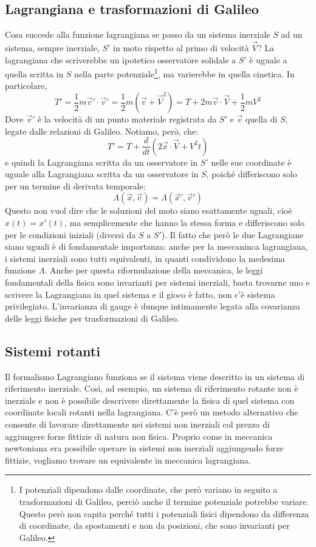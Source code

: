 \documentclass[a4paper,openany]{article}
\begin{document}
	\subsection{Lagrangiana e trasformazioni di Galileo}
	Cosa succede alla funzione lagrangiana se passo da un sistema inerziale $S$ ad un sistema, sempre inerziale, $S'$ in moto rispetto al primo di velocità $\vec{V}$? La lagrangiana che scriverebbe un ipotetico osservatore solidale a $S'$ è uguale a quella scritta in $S$ nella parte potenziale\footnote{I potenziali dipendono dalle coordinate, che però variano in seguito a trasformazioni di Galileo, perciò anche il termine potenziale potrebbe variare. Questo però non capita perché tutti i potenziali fisici dipendono da differenza di coordinate, da spostamenti e non da posizioni, che sono invarianti per Galileo.}, ma varierebbe in quella cinetica. In particolare,
	$$
	T' = \dfrac{1}{2}m\vec{v}'\cdot\vec{v}'= \dfrac{1}{2}m(\vec{v}+\vec{V}^2) = T + 2m\vec{v}\cdot\vec{V}+\dfrac{1}{2}mV^{2}
	$$
	Dove $\vec{v}'$ è la velocità di un punto materiale registrata da $S'$ e $\vec{v}$ quella di $S$, legate dalle relazioni di Galileo. Notiamo, però, che:
	$$
	T' = T + \dfrac{d}{dt}(2\vec{x}\cdot\vec{V}+V^{2}t)
	$$
	e quindi la Lagrangiana scritta da un osservatore in $S'$ nelle sue coordinate è uguale alla Lagrangiana scritta da un osservatore in $S$, poiché differiscono solo per un termine di derivata temporale:
	$$
	\Lambda(\vec{x},\vec{v}) = \Lambda(\vec{x}',\vec{v}')
	$$
	Questo non vuol dire che le soluzioni del moto siano esattamente uguali, cioè $x(t) = x'(t)$, ma semplicemente che hanno la stessa forma e differiscono solo per le condizioni iniziali (diversi da $S$ a $S'$). Il fatto che però le due Lagrangiane siano uguali è di fondamentale importanza: anche per la meccaninca lagrangiana, i sistemi inerziali sono tutti equivalenti, in quanti condividono la medesima funzione $\Lambda$. Anche per questa riformulazione della meccanica, le leggi fondamentali della fisica sono invarianti per sistemi inerziali, basta trovarne uno e scrivere la Lagrangiana in quel sistema e il gioco è fatto, non c'è sistema privilegiato. L'invarianza di gauge è dunque intimamente legata alla covarianza delle leggi fisiche per trasformazioni di Galileo.
	\subsection{Sistemi rotanti}
	Il formalismo Lagrangiano funziona se il sistema viene descritto in un sistema di riferimento inerziale. Così, ad esempio, un sistema di riferimento rotante non è inerziale e non è possibile descrivere direttamente la fisica di quel sistema con coordinate locali rotanti nella lagrangiana. C'è però un metodo alternativo che consente di lavorare direttamente nei sistemi non inerziali col prezzo di aggiungere forze fittizie di natura non fisica. Proprio come in meccanica newtoniana era possibile operare in sistemi non inerziali aggiungendo forze fittizie, vogliamo trovare un equivalente in meccanica lagrangiana.
	
\end{document}
